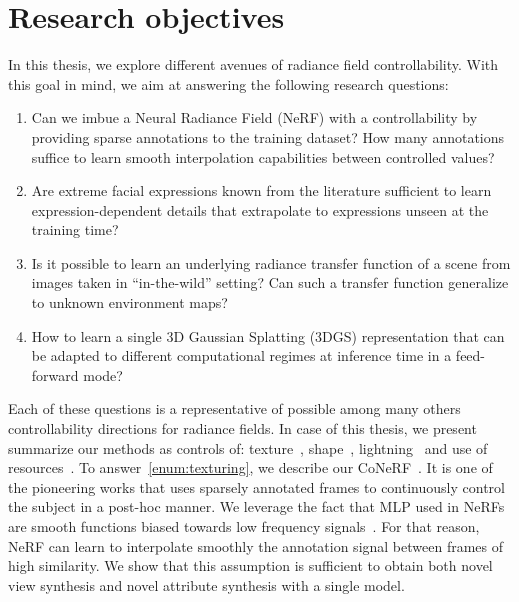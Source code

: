 \section{Research objectives}
  In this thesis, we explore different avenues of radiance field
  controllability.
  With this goal in mind, we aim at answering the following research questions:
  \begin{enumerate}[label=(\textbf{RQ \arabic*})]
    \item \label{enum:texturing}
          Can we imbue a Neural Radiance Field (NeRF) with a controllability by
          providing sparse annotations to the training dataset?
          How many annotations suffice to learn smooth interpolation capabilities
          between controlled values?

    \item \label{enum:movement}
          Are extreme facial expressions known from the literature sufficient to learn
          expression-dependent details that extrapolate to expressions unseen at the
          training time?

    \item \label{enum:lighting}
          Is it possible to learn an underlying radiance transfer function of a scene
          from images taken in ``in-the-wild'' setting?
          Can such a transfer function generalize to unknown environment maps?

    \item \label{enum:resources}
          How to learn a single 3D Gaussian Splatting (3DGS) representation that can be
          adapted to different computational regimes at inference time in a feed-forward
          mode?
  \end{enumerate}

  Each of these questions is a representative of possible among many others
  controllability directions for radiance fields.
  In case of this thesis, we present summarize our methods as controls of:
  texture~\cite{kania2022conerf,kania2023blendfields},
  shape~\cite{kania2023blendfields}, lightning~\cite{kaleta2024lumigauss} and
  use of resources~\cite{kania2024clog}.
  To answer~\ref{enum:texturing}, we describe our CoNeRF~\cite{kania2022conerf}.
  It is one of the pioneering works that uses sparsely annotated frames to
  continuously control the subject in a post-hoc manner.
  We leverage the fact that MLP used in NeRFs are smooth functions biased
  towards low frequency signals~\cite{tancik2020fourier}.
  For that reason, NeRF can learn to interpolate smoothly the annotation signal
  between frames of high similarity.
  We show that this assumption is sufficient to obtain both novel view synthesis
  and novel attribute synthesis with a single model.

